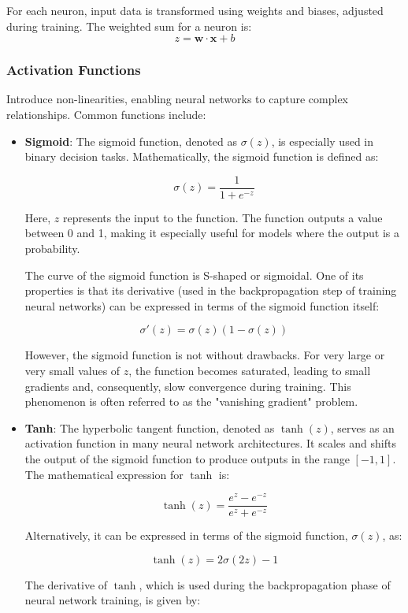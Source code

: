 For each neuron, input data is transformed using weights and biases, adjusted during training. The weighted sum for a neuron is:
\[
z = \mathbf{w} \cdot \mathbf{x} + b
\]

\subsubsection{Activation Functions}

Introduce non-linearities, enabling neural networks to capture complex relationships. Common functions include:

\begin{itemize}
	\item \textbf{Sigmoid}: 
The sigmoid function, denoted as \( \sigma(z) \), is especially used in binary decision tasks. Mathematically, the sigmoid function is defined as:

\[
\sigma(z) = \frac{1}{1 + e^{-z}}
\]

Here, \( z \) represents the input to the function. The function outputs a value between 0 and 1, making it especially useful for models where the output is a probability. 

The curve of the sigmoid function is S-shaped or sigmoidal. One of its properties is that its derivative (used in the backpropagation step of training neural networks) can be expressed in terms of the sigmoid function itself:

\[
\sigma'(z) = \sigma(z)(1 - \sigma(z))
\]

However, the sigmoid function is not without drawbacks. For very large or very small values of \( z \), the function becomes saturated, leading to small gradients and, consequently, slow convergence during training. This phenomenon is often referred to as the "vanishing gradient" problem.
	
	\item \textbf{Tanh}: 
The hyperbolic tangent function, denoted as \( \tanh(z) \), serves as an activation function in many neural network architectures. It scales and shifts the output of the sigmoid function to produce outputs in the range \([-1, 1]\). The mathematical expression for \( \tanh \) is:

\[
\tanh(z) = \frac{e^{z} - e^{-z}}{e^{z} + e^{-z}}
\]

Alternatively, it can be expressed in terms of the sigmoid function, \( \sigma(z) \), as:

\[
\tanh(z) = 2\sigma(2z) - 1
\]

The derivative of \( \tanh \), which is used during the backpropagation phase of neural network training, is given by:


\end{itemize}
